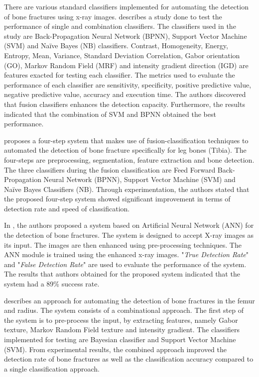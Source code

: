 \documentclass[11pt,twocolumn]{witseiepaper}
\begin{document}
	There are various standard classifiers implemented for automating the detection of bone fractures using x-ray images. \cite{Mahendran2012} describes a study done to test the performance of single and combination classifiers. The classifiers used in the study are Back-Propagation Neural Network (BPNN), Support Vector Machine (SVM) and Na\"{i}ve Bayes (NB) classifiers. Contrast, Homogeneity, Energy, Entropy, Mean, Variance, Standard Deviation Correlation, Gabor orientation (GO), Markov Random Field (MRF) and intensity gradient direction (IGD) are features exacted for testing each classifier. The metrics used to evaluate the performance of each classifier are sensitivity, specificity, positive predictive value, negative predictive value, accuracy and execution time. The authors discovered that fusion classifiers enhances the detection capacity. Furthermore, the results indicated that the combination of SVM and BPNN obtained the best performance.
	
	\cite{Mahendran_Enhanced} proposes a four-step system that makes use of fusion-classification techniques to automated the detection of bone fracture specifically for leg bones (Tibia). The four-steps are preprocessing, segmentation, feature extraction and bone detection. The three classifiers during the fusion classification are Feed Forward Back-Propagation Neural Network (BPNN), Support Vector Machine (SVM) and Na\"{i}ve Bayes Classifiers (NB). Through experimentation, the authors stated that the proposed four-step system showed significant improvement in terms of detection rate and speed of classification.
	
	In \cite{ComputerAidedBoneFractureDetection}, the authors proposed a system based on Artificial Neural Network (ANN) for the detection of bone fractures. The system is designed to accept X-ray images as its input. The images are then enhanced using pre-processing techniques. The ANN module is trained using the enhanced x-ray images. "\textit{True Detection Rate}" and "\textit{False Detection Rate}" are used to evaluate the performance of the system. The results that authors obtained for the proposed system indicated that the system had a 89\% success rate.
	
	\cite{lim2004detection} describes an approach for automating the detection of bone fractures in the femur and radius. The system consists of a combinational approach. The first step of the system is to pre-process the input, by extracting features, namely Gabor texture, Markov Random Field texture and intensity gradient. The classifiers implemented for testing are Bayesian classifier and Support Vector Machine (SVM). From experimental results, the combined approach improved the detection rate of bone fractures as well as the classification accuracy compared to a single classification approach.
	
\end{document}
